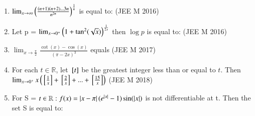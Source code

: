 \documentclass[journal,12pt,twocolumn]{IEEEtran}
\theoremstyle{remark}
\begin{document}
\begin{enumerate}[start=36]
\item $\lim_{x\to\infty} \left(\frac{(n+1)(n+2)...3n}{n^{2n}}\right)^{\frac{1}{n}} $ is equal to:
	\hfill{(JEE M 2016)}
	\begin{enumerate}[label=(\alph*)]
	\end{enumerate}
\item Let p = $\lim_{x\to0^+} \left(1+\tan^2(\sqrt{x})\right)^{\frac{1}{2x}} $ then $\log p$ is equal to:
	\hfill{(JEE M 2016)}
	\begin{enumerate}[label=(\alph*)]
	\end{enumerate}
\item $\lim_{x\to\frac{\pi}{2}} \frac{\cot(x)-\cos(x)}{(\pi -2x)^3} $ equals 
	\hfill{(JEE M 2017)}
	\begin{enumerate}[label=(\alph*)]
	\end{enumerate}
\item For each $t\in\mathbb{R}$, let ${}\left[t\right]$ be the greatest integer less than or equal to $t$. Then 
	$\lim_{x\to0^+} x\left( {}\left[\frac{1}{x}\right]+{}\left[\frac{2}{x}\right]+...+{}\left[ \frac{15}{x}\right]\right) $
	\hfill{(JEE M 2018)}
	\begin{enumerate}[label=(\alph*)]
	\end{enumerate}
\item For S =  $t\in\mathbb{R}:f(x)=\left\vert x-\pi\right\vert(e^{\left\vert x\right\vert}-1)\sin(\left\vert x\right\vert)$ is not differentiable at t. Then the set S is equal to:


\end{enumerate}
\end{document}
